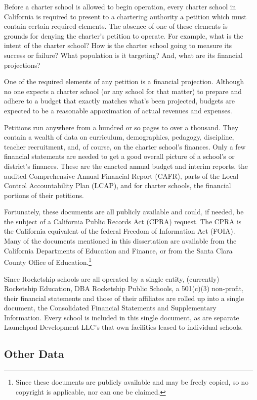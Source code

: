 Before a charter school is allowed to begin operation, every charter school in California is required to present to a chartering authority a petition which must contain certain required elements. The absence of one of these elements is grounds for denying the charter's petition to operate. For example, what is the intent of the charter school? How is the charter school going to measure its success or failure? What population is it targeting? And, what are its financial projections?

One of the required elements of any petition is a financial projection. Although no one expects a charter school (or any school for that matter) to prepare and adhere to a budget that exactly matches what's been projected, budgets are expected to be a reasonable appoximation of actual revenues and expenses.

Petitions run anywhere from a hundred or so pages to over a thousand. They contain a wealth of data on curriculum, demographics, pedagogy, discipline, teacher recruitment, and, of course, on the charter school's finances. Only a few financial statements are needed to get a good overall picture of a school's or district's finances. These are the enacted annual budget and interim reports, the audited Comprehensive Annual Financial Report (CAFR), parts of the Local Control Accountability Plan (LCAP), and for charter schools, the financial portions of their petitions.

Fortunately, these documents are all publicly available and could, if needed, be the subject of a California Public Records Act (CPRA) request. The CPRA is the California equivalent of the federal Freedom of Information Act (FOIA). Many of the documents mentioned in this dissertation are available from the California Departments of Education and Finance, or from the Santa Clara County Office of Education.\footnote{Since these documents are publicly available and may be freely copied, so no copyright is applicable, nor can one be claimed.}

Since Rocketship schools are all operated by a single entity, (currently) Rocketship Education, DBA Rocketship Public Schools, a 501(c)(3) non-profit, their financial statements and those of their affiliates are rolled up into a single document, the Consolidated Financial Statements and Supplementary Information. Every school is included in this single document, as are separate Launchpad Development LLC's that own facilities leased to individual schools. %

\subsection{Other Data}\label{sec:other-data}\indent

